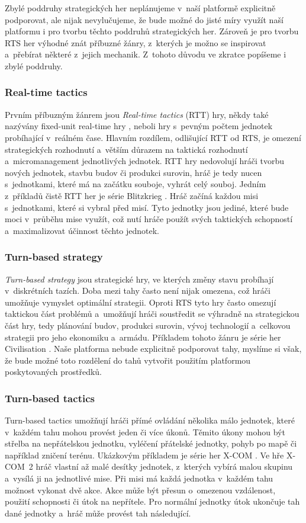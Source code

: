 Zbylé poddruhy strategických her neplánujeme v~naší platformě explicitně podporovat, ale nijak nevylučujeme, že bude možné do jisté míry využít naší platformu i pro tvorbu těchto poddruhů strategických her. Zároveň je pro tvorbu RTS her výhodné znát příbuzné žánry, z~kterých je možno se inspirovat a~přebírat některé z~jejich mechanik. Z~tohoto důvodu ve zkratce popíšeme i zbylé poddruhy.

\subsubsection{Real-time tactics}
Prvním příbuzným žánrem jsou \emph{Real-time tactics} (RTT) hry, někdy také nazývány fixed-unit real-time hry \citep{site:stratg02}, neboli hry s~pevným počtem jednotek probíhající v~reálném čase. Hlavním rozdílem, odlišující RTT od RTS, je omezení  strategických rozhodnutí a~větším důrazem na taktická rozhodnutí a~micromanagement jednotlivých jednotek. RTT hry nedovolují hráči tvorbu nových jednotek, stavbu budov či produkci surovin, hráč je tedy nucen s~jednotkami, které má na začátku souboje, vyhrát celý souboj.  Jedním z~příkladů čistě RTT her je série Blitzkrieg \citep{site:blitzkrieg}. Hráč začíná každou misi s~jednotkami, které si vybral před misí. Tyto jednotky jsou jediné, které bude moci v~průběhu mise využít, což nutí hráče použít svých taktických schopností a~maximalizovat účinnost těchto jednotek. 

\subsubsection{Turn-based strategy}
\emph{Turn-based strategy} jsou strategické hry, ve kterých změny stavu probíhají v~diskrétních tazích. Doba mezi tahy často není nijak omezena, což hráči umožňuje vymyslet optimální strategii. Oproti RTS tyto hry často omezují taktickou část problémů a~umožňují hráči soustředit se výhradně na strategickou část hry, tedy plánování budov, produkci surovin, vývoj technologií a~celkovou strategii pro jeho ekonomiku a~armádu. Příkladem tohoto žánru je série her Civilisation \citep{site:civ5}. Naše platforma nebude explicitně podporovat tahy, myslíme si však, že bude možné toto rozdělení do tahů vytvořit použitím platformou poskytovaných prostředků.

\subsubsection{Turn-based tactics}
Turn-based tactics umožňují hráči přímé ovládání několika málo jednotek, které v~každém tahu mohou provést jeden či více úkonů. Těmito úkony mohou být střelba na nepřátelskou jednotku, vyléčení přátelské jednotky, pohyb po mapě či například zničení terénu. Ukázkovým příkladem je série her X-COM \citep{site:XCOM}. Ve hře X-COM~2 hráč vlastní až malé desítky jednotek, z~kterých vybírá malou skupinu a~vysílá ji na jednotlivé mise. Při misi má každá jednotka v~každém tahu možnost vykonat dvě akce. Akce může být přesun o~omezenou vzdálenost, použití schopnosti či útok na nepřítele. Pro normální jednotky útok ukončuje tah dané jednotky a~hráč může provést tah následující. 

